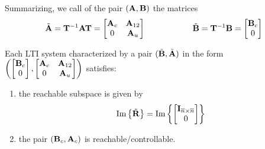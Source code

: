	Summarizing, we call  of the pair $(\mathbf{A},\mathbf{B})$ the matrices
	\begin{equation} \label{eq:gram:controllabledecomposition}
		\tilde {\mathbf{A}} = \mathbf{T}^{-1}\mathbf{A}\mathbf{T} = \begin{bmatrix} \mathbf{A}_c & \mathbf{A}_{12} \\ 0 & \mathbf{A}_u \end{bmatrix} \hspace{2cm} \tilde {\mathbf{B}} = \mathbf{T}^{-1}\mathbf{B} = \begin{bmatrix} \mathbf{B}_c \\ 0 \end{bmatrix}
	\end{equation}
	\begin{theorem}
		Each LTI system characterized by a pair $(\tilde {\mathbf{B}},\tilde {\mathbf{A}})$ in the form $\left(\begin{bmatrix} \mathbf{B}_c \\ 0 \end{bmatrix},\begin{bmatrix} \mathbf{A}_c & \mathbf{A}_{12} \\ 0 & \mathbf{A}_u \end{bmatrix} \right)$ satisfies:
		\begin{enumerate}[\itshape i)]
			\item the reachable subspace is given by
			\[ \textrm{Im}\left\{\tilde {\mathbf{R}}\right\} = \textrm{Im}\left\{\begin{bmatrix} \mathbf{I}_{\overline n\times \overline n} \\ 0 \end{bmatrix}\right\} \]
			\item the pair $(\mathbf{B}_c,\mathbf{A}_c)$ is reachable/controllable.
		\end{enumerate}
	\end{theorem}
	
	
	
	